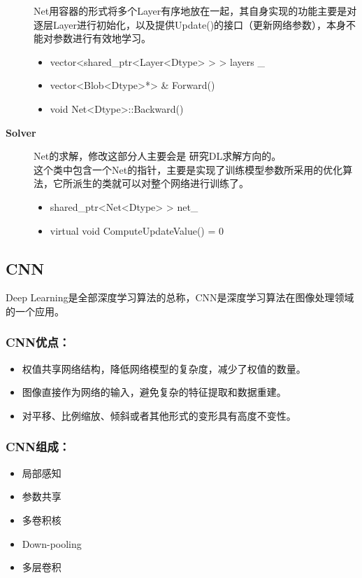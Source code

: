 \documentclass[12pt]{article}
\begin{document}
\begin{description}
Net用容器的形式将多个Layer有序地放在一起，其自身实现的功能主要是对逐层Layer进行初始化，以及提供Update()的接口（更新网络参数），本身不能对参数进行有效地学习。
	\begin{itemize}
	\item vector<shared\_ptr<Layer<Dtype> > > layers \_
	\item vector<Blob<Dtype>*> \& Forward()
	\item void Net<Dtype>::Backward()
	\end{itemize}
\item[\textbf{Solver}] Net的求解，修改这部分人主要会是{\color{blue} 研究DL求解}方向的。\\
	这个类中包含一个Net的指针，主要是实现了训练模型参数所采用的优化算法，它所派生的类就可以对整个网络进行训练了。
	\begin{itemize}
	\item shared\_ptr<Net<Dtype> > net\_
	\item virtual void ComputeUpdateValue() = 0
	\end{itemize}
\end{description}

\subsection{CNN}
Deep Learning是全部深度学习算法的总称，CNN是深度学习算法在图像处理领域的一个应用。

\subsubsection{CNN优点：}
\begin{itemize}
\item 权值共享网络结构，降低网络模型的复杂度，减少了权值的数量。
\item 图像直接作为网络的输入，避免复杂的特征提取和数据重建。
\item 对平移、比例缩放、倾斜或者其他形式的变形具有高度不变性。
\end{itemize}

\subsubsection{CNN组成：}
\begin{itemize}
\item 局部感知
\item 参数共享
\item 多卷积核
\item Down-pooling
\item 多层卷积
\end{itemize}
\end{document}
